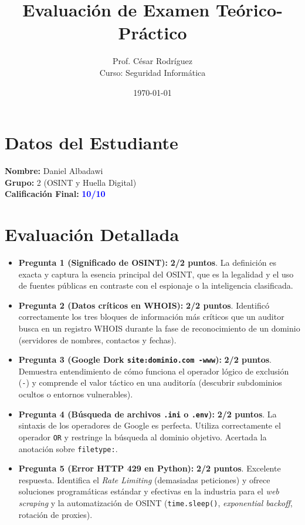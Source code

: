 \documentclass[12pt,a4paper]{article}
\title{Evaluación de Examen Teórico-Práctico}
\author{Prof. César Rodríguez \\ \small Curso: Seguridad Informática}
\date{\today}
\begin{document}
\maketitle

\section*{Datos del Estudiante}
\textbf{Nombre:} Daniel Albadawi \\
\textbf{Grupo:} 2 (OSINT y Huella Digital) \\
\textbf{Calificación Final:} \textbf{\textcolor{blue}{10/10}}

\section*{Evaluación Detallada}

\begin{itemize}[label=$\bullet$]
    \item \textbf{Pregunta 1 (Significado de OSINT):} \textbf{2/2 puntos}. La definición es exacta y captura la esencia principal del OSINT, que es la legalidad y el uso de fuentes públicas en contraste con el espionaje o la inteligencia clasificada.
    
    \item \textbf{Pregunta 2 (Datos críticos en WHOIS):} \textbf{2/2 puntos}. Identificó correctamente los tres bloques de información más críticos que un auditor busca en un registro WHOIS durante la fase de reconocimiento de un dominio (servidores de nombres, contactos y fechas).
    
    \item \textbf{Pregunta 3 (Google Dork \texttt{site:dominio.com -www}):} \textbf{2/2 puntos}. Demuestra entendimiento de cómo funciona el operador lógico de exclusión (\texttt{-}) y comprende el valor táctico en una auditoría (descubrir subdominios ocultos o entornos vulnerables).
    
    \item \textbf{Pregunta 4 (Búsqueda de archivos \texttt{.ini} o \texttt{.env}):} \textbf{2/2 puntos}. La sintaxis de los operadores de Google es perfecta. Utiliza correctamente el operador \texttt{OR} y restringe la búsqueda al dominio objetivo. Acertada la anotación sobre \texttt{filetype:}.
    
    \item \textbf{Pregunta 5 (Error HTTP 429 en Python):} \textbf{2/2 puntos}. Excelente respuesta. Identifica el \textit{Rate Limiting} (demasiadas peticiones) y ofrece soluciones programáticas estándar y efectivas en la industria para el \textit{web scraping} y la automatización de OSINT (\texttt{time.sleep()}, \textit{exponential backoff}, rotación de proxies).
\end{itemize}
\end{document}
